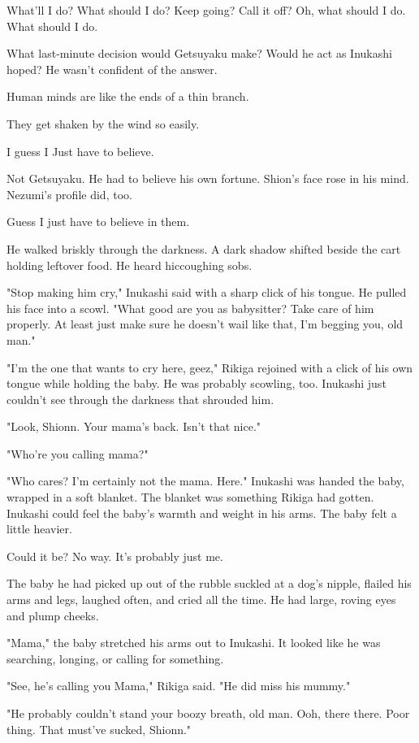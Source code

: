 What'll I do? What should I do? Keep going? Call it off? Oh, what should
I do. What should I do.

What last-minute decision would Getsuyaku make? Would he act as Inukashi
hoped? He wasn't confident of the answer.

Human minds are like the ends of a thin branch.

They get shaken by the wind so easily.

I guess I Just have to believe.

Not Getsuyaku. He had to believe his own fortune. Shion's face rose in
his mind. Nezumi's profile did, too.

Guess I just have to believe in them.

He walked briskly through the darkness. A dark shadow shifted beside the
cart holding leftover food. He heard hiccoughing sobs.

"Stop making him cry," Inukashi said with a sharp click of his tongue.
He pulled his face into a scowl. "What good are you as babysitter? Take
care of him properly. At least just make sure he doesn't wail like that,
I'm begging you, old man."

"I'm the one that wants to cry here, geez," Rikiga rejoined with a click
of his own tongue while holding the baby. He was probably scowling, too.
Inukashi just couldn't see through the darkness that shrouded him.

"Look, Shionn. Your mama's back. Isn't that nice."

"Who're you calling mama?"

"Who cares? I'm certainly not the mama. Here." Inukashi was handed the
baby, wrapped in a soft blanket. The blanket was something Rikiga had
gotten. Inukashi could feel the baby's warmth and weight in his arms.
The baby felt a little heavier.

Could it be? No way. It's probably just me.

The baby he had picked up out of the rubble suckled at a dog's nipple,
flailed his arms and legs, laughed often, and cried all the time. He had
large, roving eyes and plump cheeks.

"Mama," the baby stretched his arms out to Inukashi. It looked like he
was searching, longing, or calling for something.

"See, he's calling you Mama," Rikiga said. "He did miss his mummy."

"He probably couldn't stand your boozy breath, old man. Ooh, there
there. Poor thing. That must've sucked, Shionn."


